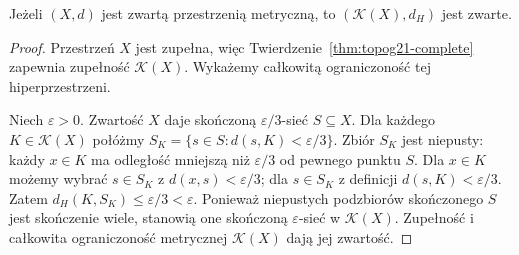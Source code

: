\begin{twierdzenie}
\label{thm:topog21-compact-metric}
Jeżeli \((X,d)\) jest zwartą przestrzenią metryczną,
to \((\mathcal K(X),d_H)\) jest zwarte.
\end{twierdzenie}
\begin{proof}
Przestrzeń \(X\) jest zupełna,
więc Twierdzenie~\ref{thm:topog21-complete}
zapewnia zupełność \(\mathcal K(X)\).
Wykażemy całkowitą ograniczoność tej hiperprzestrzeni.

Niech \(\varepsilon>0\).
Zwartość \(X\) daje skończoną
\(\varepsilon/3\)-sieć \(S\subseteq X\).
Dla każdego \(K\in\mathcal K(X)\) połóżmy
\(S_K=\{s\in S:d(s,K)<\varepsilon/3\}\).
Zbiór \(S_K\) jest niepusty: każdy \(x\in K\)
ma odległość mniejszą niż \(\varepsilon/3\)
od pewnego punktu \(S\).
Dla \(x\in K\) możemy wybrać \(s\in S_K\)
z \(d(x,s)<\varepsilon/3\); dla \(s\in S_K\)
z definicji \(d(s,K)<\varepsilon/3\).
Zatem \(d_H(K,S_K)\le\varepsilon/3<\varepsilon\).
Ponieważ niepustych podzbiorów skończonego \(S\)
jest skończenie wiele, stanowią one skończoną
\(\varepsilon\)-sieć w \(\mathcal K(X)\).
Zupełność i całkowita ograniczoność
metrycznej \(\mathcal K(X)\) dają jej zwartość.
\end{proof}

